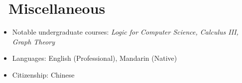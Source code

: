 \documentclass{resume}
\begin{document}
\section{\faInfo\ Miscellaneous}
\begin{itemize}[parsep=0.5ex]
  \item Notable undergraduate courses:
      \textit{Logic for Computer Science, Calculus III, Graph Theory}
  \item Languages: English (Professional), Mandarin (Native)
  \item Citizenship: Chinese
\end{itemize}



\phantom{}
\end{document}
